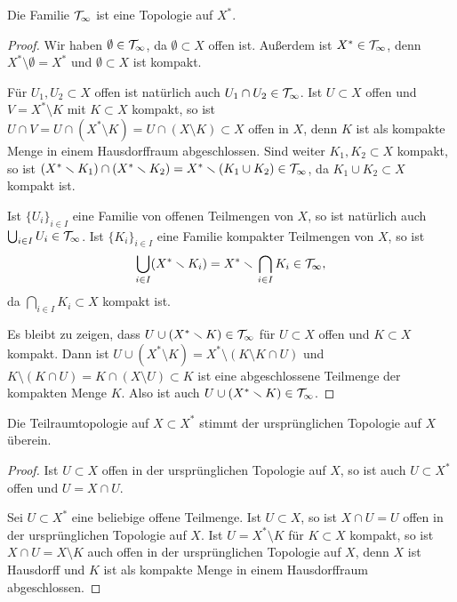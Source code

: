 \begin{lemma}
Die Familie $\cal T_\infty$ ist eine Topologie auf $X^*$.
\end{lemma}
\begin{proof}
Wir haben $\emptyset\in\cal T_\infty$, da $\emptyset\subset X$ offen ist. Außerdem ist $X^*\in\cal T_\infty$, denn $X^*\setminus \emptyset = X^*$ und $\emptyset\subset X$ ist kompakt.

Für $U_1,U_2\subset X$ offen ist natürlich auch $U_1\cap U_2\in\cal T_\infty$. Ist $U\subset X$ offen und $V = X^*\setminus K$ mit $K\subset X$ kompakt, so ist $U\cap V = U\cap (X^*\setminus K) = U\cap (X\setminus K)\subset X$ offen in $X$, denn $K$ ist als kompakte Menge in einem Hausdorffraum abgeschlossen. Sind weiter $K_1,K_2\subset X$ kompakt, so ist $(X^*\setminus K_1)\cap (X^*\setminus K_2) = X^*\setminus (K_1\cup K_2)\in\cal T_\infty$, da $K_1\cup K_2\subset X$ kompakt ist.

Ist $\{U_i\}_{i\in I}$ eine Familie von offenen Teilmengen von $X$, so ist natürlich auch $\bigcup_{i\in I} U_i\in\cal T_\infty$. Ist $\{K_i\}_{i\in I}$ eine Familie kompakter Teilmengen von $X$, so ist
\[
\bigcup_{i\in I} (X^*\setminus K_i) = X^*\setminus \bigcap_{i\in I} K_i \in \cal T_\infty,
\]
da $\bigcap_{i\in I} K_i\subset X$ kompakt ist.

Es bleibt zu zeigen, dass $U\cup (X^*\setminus K)\in\cal T_\infty$ für $U\subset X$ offen und $K\subset X$ kompakt. Dann ist $U\cup (X^*\setminus K) = X^*\setminus (K\setminus K\cap U)$ und $K\setminus (K\cap U) = K\cap (X\setminus U)\subset K$ ist eine abgeschlossene Teilmenge der kompakten Menge $K$. Also ist auch $U\cup (X^*\setminus K)\in\cal T_\infty$.
\end{proof}
\begin{lemma}
Die Teilraumtopologie auf $X\subset X^*$ stimmt der ursprünglichen Topologie auf $X$ überein.
\end{lemma}
\begin{proof}
Ist $U\subset X$ offen in der ursprünglichen Topologie auf $X$, so ist auch $U\subset X^*$ offen und $U = X\cap U$.

Sei $U\subset X^*$ eine beliebige offene Teilmenge. Ist $U\subset X$, so ist $X\cap U = U$ offen in der ursprünglichen Topologie auf $X$. Ist $U = X^*\setminus K$ für $K\subset X$ kompakt, so ist $X\cap U = X\setminus K$ auch offen in der ursprünglichen Topologie auf $X$, denn $X$ ist Hausdorff und $K$ ist als kompakte Menge in einem Hausdorffraum abgeschlossen.
\end{proof}

